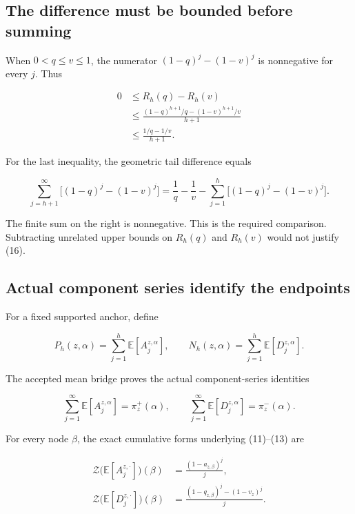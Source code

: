 \documentclass[11pt,a4paper]{article}
\begin{document}
\subsection{The difference must be bounded before summing}\label{the-difference-must-be-bounded-before-summing}

When \(0<q\le v\le1\), the numerator \((1-q)^j-(1-v)^j\) is nonnegative for every \(j\). Thus

\[
\begin{aligned}
0&\le R_h(q)-R_h(v)\\
&\le\frac{(1-q)^{h+1}/q-(1-v)^{h+1}/v}{h+1}\\
&\le\frac{1/q-1/v}{h+1}.
\end{aligned} \tag{16}
\]

For the last inequality, the geometric tail difference equals

\[
\sum_{j=h+1}^{\infty}\big[(1-q)^j-(1-v)^j\big]
=\frac1q-\frac1v
 -\sum_{j=1}^{h}\big[(1-q)^j-(1-v)^j\big].
\]

The finite sum on the right is nonnegative. This is the required comparison. Subtracting unrelated upper bounds on \(R_h(q)\) and \(R_h(v)\) would not justify (16).

\subsection{Actual component series identify the endpoints}\label{actual-component-series-identify-the-endpoints}

For a fixed supported anchor, define

\[
P_h(z,\alpha)=\sum_{j=1}^{h}\mathbb E[A_j^{z,\alpha}],
\qquad
N_h(z,\alpha)=\sum_{j=1}^{h}\mathbb E[D_j^{z,\alpha}].
\]

The accepted mean bridge proves the actual component-series identities

\[
\sum_{j=1}^{\infty}\mathbb E[A_j^{z,\alpha}]=\pi_z^+(\alpha),
\qquad
\sum_{j=1}^{\infty}\mathbb E[D_j^{z,\alpha}]=\pi_z^-(\alpha). \tag{17}
\]

For every node \(\beta\), the exact cumulative forms underlying (11)--(13) are

\[
\begin{aligned}
\mathcal Z\big(\mathbb E[A_j^{z,\cdot}]\big)(\beta)
 &=\frac{(1-a_{z,\beta})^j}{j},\\
\mathcal Z\big(\mathbb E[D_j^{z,\cdot}]\big)(\beta)
 &=\frac{(1-q_{z,\beta})^j-(1-v_z)^j}{j}.
\end{aligned}
\]
\end{document}
